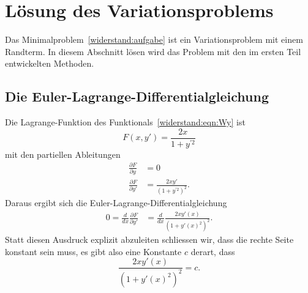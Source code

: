 %
%
%
%
\section{Lösung des Variationsproblems
\label{widerstand:section:loesung}}
Das Minimalproblem~\ref{widerstand:aufgabe} ist ein Variationsproblem
mit einem Randterm.
In diesem Abschnitt lösen wird das Problem mit den im ersten Teil
entwickelten Methoden.

%
%
\subsection{Die Euler-Lagrange-Differentialgleichung}
Die Lagrange-Funktion des Funktionals~\eqref{widerstand:eqn:Wy} ist 
\[
F(x,y')
=
\frac{2x}{1+y^{\prime 2}}
\]
mit den partiellen Ableitungen
\begin{align*}
\frac{\partial F}{\partial y}&=0
\\
\frac{\partial F}{\partial y'}
&=
\frac{2xy'}{(1+y^{\prime 2})^2}.
\end{align*}
Daraus ergibt sich die Euler-Lagrange-Differentialgleichung
\begin{align*}
0
=
\frac{d}{dx} \frac{\partial F}{\partial y'}
&=
\frac{d}{dx}
\frac{2xy'(x)}{(1+y'(x)^2)^2}.
\end{align*}
Statt diesen Ausdruck explizit abzuleiten schliessen wir, dass die rechte
Seite konstant sein muss, es gibt also eine Konstante $c$ derart, dass
\[
\frac{ 2xy'(x) }{ (1+y'(x)^2)^2 } = c.
\]



